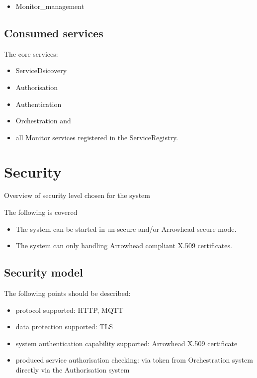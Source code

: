 \documentclass[a4paper]{arrowhead}
\begin{document}
\begin{itemize}
\item Monitor\_management
\end{itemize}

\subsection{Consumed services}

The core services:
\begin{itemize}
\item ServiceDsicovery
\item Authorisation
\item Authentication
\item Orchestration and 
\item all Monitor services registered in the ServiceRegistry.
\end{itemize}





\section{Security}
\label{sec:security}


Overview of security level chosen for the system

The following is covered 
\begin{itemize}
\item  The system can be started in un-secure and/or
Arrowhead secure mode.
\item The system can only handling Arrowhead compliant X.509 certificates.
\end{itemize}

\subsection {Security model}
The following points should be described:
\begin{itemize}
\item protocol supported: HTTP, MQTT 
\item data protection supported: TLS 
\item system authentication capability supported: Arrowhead X.509 certificate
\item produced service authorisation checking: via token from
  Orchestration system directly via the Authorisation system 

\end{itemize}
\end{document}
